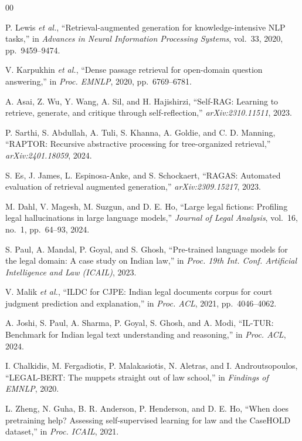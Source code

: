\documentclass[conference]{IEEEtran}
\begin{document}
\begin{thebibliography}{00}

 P. Lewis \textit{et al.}, ``Retrieval-augmented generation for knowledge-intensive NLP tasks,'' in \textit{Advances in Neural Information Processing Systems}, vol.~33, 2020, pp.~9459--9474.

 V. Karpukhin \textit{et al.}, ``Dense passage retrieval for open-domain question answering,'' in \textit{Proc. EMNLP}, 2020, pp.~6769--6781.

 A. Asai, Z. Wu, Y. Wang, A. Sil, and H. Hajishirzi, ``Self-RAG: Learning to retrieve, generate, and critique through self-reflection,'' \textit{arXiv:2310.11511}, 2023.

 P. Sarthi, S. Abdullah, A. Tuli, S. Khanna, A. Goldie, and C. D. Manning, ``RAPTOR: Recursive abstractive processing for tree-organized retrieval,'' \textit{arXiv:2401.18059}, 2024.

 S. Es, J. James, L. Espinosa-Anke, and S. Schockaert, ``RAGAS: Automated evaluation of retrieval augmented generation,'' \textit{arXiv:2309.15217}, 2023.

 M. Dahl, V. Magesh, M. Suzgun, and D. E. Ho, ``Large legal fictions: Profiling legal hallucinations in large language models,'' \textit{Journal of Legal Analysis}, vol.~16, no.~1, pp.~64--93, 2024.

 S. Paul, A. Mandal, P. Goyal, and S. Ghosh, ``Pre-trained language models for the legal domain: A case study on Indian law,'' in \textit{Proc. 19th Int. Conf. Artificial Intelligence and Law (ICAIL)}, 2023.

 V. Malik \textit{et al.}, ``ILDC for CJPE: Indian legal documents corpus for court judgment prediction and explanation,'' in \textit{Proc. ACL}, 2021, pp.~4046--4062.

 A. Joshi, S. Paul, A. Sharma, P. Goyal, S. Ghosh, and A. Modi, ``IL-TUR: Benchmark for Indian legal text understanding and reasoning,'' in \textit{Proc. ACL}, 2024.

 I. Chalkidis, M. Fergadiotis, P. Malakasiotis, N. Aletras, and I. Androutsopoulos, ``LEGAL-BERT: The muppets straight out of law school,'' in \textit{Findings of EMNLP}, 2020.

 L. Zheng, N. Guha, B. R. Anderson, P. Henderson, and D. E. Ho, ``When does pretraining help? Assessing self-supervised learning for law and the CaseHOLD dataset,'' in \textit{Proc. ICAIL}, 2021.


\end{thebibliography}
\end{document}
